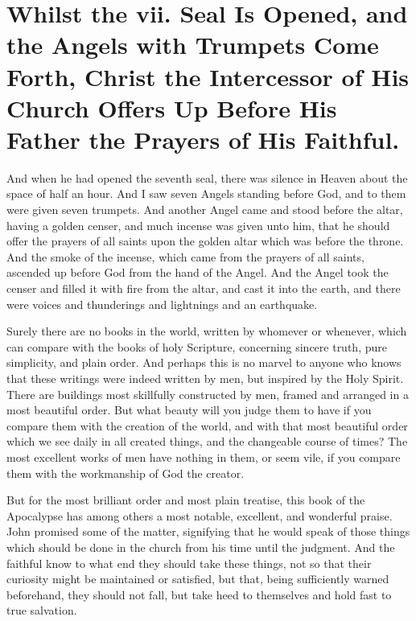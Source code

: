 \chapter[Sermon 37. Whilst the vii. Seal Is Opened, and the Angels with Trumpets Come Forth, Christ the Intercessor of His Church Offers Up Before His Father the Prayers of His Faithful.]{Whilst the vii. Seal Is Opened, and the Angels with Trumpets Come Forth, Christ the Intercessor of His Church Offers Up Before His Father the Prayers of His Faithful.}
\label{sermon:037}

And when he had opened the seventh seal, there was silence in Heaven about the space of half an hour. And I saw seven Angels standing before God, and to them were given seven trumpets. And another Angel came and stood before the altar, having a golden censer, and much incense was given unto him, that he should offer the prayers of all saints upon the golden altar which was before the throne. And the smoke of the incense, which came from the prayers of all saints, ascended up before God from the hand of the Angel. And the Angel took the censer and filled it with fire from the altar, and cast it into the earth, and there were voices and thunderings and lightnings and an earthquake.

Surely there are no books in the world, written by whomever or whenever, which can compare with the books of holy Scripture, concerning sincere truth, pure simplicity, and plain order. And perhaps this is no marvel to anyone who knows that these writings were indeed written by men, but inspired by the Holy Spirit. There are buildings most skillfully constructed by men, framed and arranged in a most beautiful order. But what beauty will you judge them to have if you compare them with the creation of the world, and with that most beautiful order which we see daily in all created things, and the changeable course of times? The most excellent works of men have nothing in them, or seem vile, if you compare them with the workmanship of God the creator.

But for the most brilliant order and most plain treatise, this book of the Apocalypse has among others a most notable, excellent, and wonderful praise. John promised some of the matter, signifying that he would speak of those things which should be done in the church from his time until the judgment. And the faithful know to what end they should take these things, not so that their curiosity might be maintained or satisfied, but that, being sufficiently warned beforehand, they should not fall, but take heed to themselves and hold fast to true salvation.

